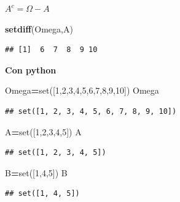 \documentclass[]{book}
\newenvironment{Shaded}{\begin{snugshade}}{\end{snugshade}}
\newcommand{\BuiltInTok}[1]{#1}
\newcommand{\DecValTok}[1]{\textcolor[rgb]{0.00,0.00,0.81}{#1}}
\newcommand{\KeywordTok}[1]{\textcolor[rgb]{0.13,0.29,0.53}{\textbf{#1}}}
\newcommand{\NormalTok}[1]{#1}
\newcommand{\OperatorTok}[1]{\textcolor[rgb]{0.81,0.36,0.00}{\textbf{#1}}}
\begin{document}
\(A^c=\Omega-A\)

\begin{Shaded}
\begin{Highlighting}[]
\KeywordTok{setdiff}\NormalTok{(Omega,A)}
\end{Highlighting}
\end{Shaded}

\begin{verbatim}
## [1]  6  7  8  9 10
\end{verbatim}

\textbf{Con python}

\begin{Shaded}
\begin{Highlighting}[]
\NormalTok{Omega}\OperatorTok{=}\BuiltInTok{set}\NormalTok{([}\DecValTok{1}\NormalTok{,}\DecValTok{2}\NormalTok{,}\DecValTok{3}\NormalTok{,}\DecValTok{4}\NormalTok{,}\DecValTok{5}\NormalTok{,}\DecValTok{6}\NormalTok{,}\DecValTok{7}\NormalTok{,}\DecValTok{8}\NormalTok{,}\DecValTok{9}\NormalTok{,}\DecValTok{10}\NormalTok{])}
\NormalTok{Omega}
\end{Highlighting}
\end{Shaded}

\begin{verbatim}
## set([1, 2, 3, 4, 5, 6, 7, 8, 9, 10])
\end{verbatim}

\begin{Shaded}
\begin{Highlighting}[]
\NormalTok{A}\OperatorTok{=}\BuiltInTok{set}\NormalTok{([}\DecValTok{1}\NormalTok{,}\DecValTok{2}\NormalTok{,}\DecValTok{3}\NormalTok{,}\DecValTok{4}\NormalTok{,}\DecValTok{5}\NormalTok{])}
\NormalTok{A}
\end{Highlighting}
\end{Shaded}

\begin{verbatim}
## set([1, 2, 3, 4, 5])
\end{verbatim}

\begin{Shaded}
\begin{Highlighting}[]
\NormalTok{B}\OperatorTok{=}\BuiltInTok{set}\NormalTok{([}\DecValTok{1}\NormalTok{,}\DecValTok{4}\NormalTok{,}\DecValTok{5}\NormalTok{])}
\NormalTok{B}
\end{Highlighting}
\end{Shaded}

\begin{verbatim}
## set([1, 4, 5])
\end{verbatim}
\end{document}
